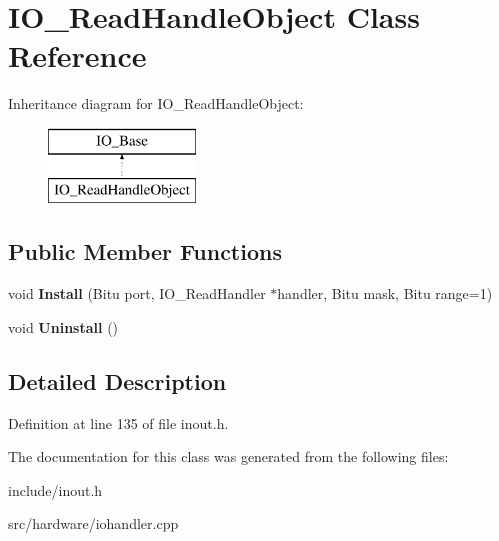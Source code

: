 \hypertarget{classIO__ReadHandleObject}{\section{I\-O\-\_\-\-Read\-Handle\-Object Class Reference}
\label{classIO__ReadHandleObject}
}
Inheritance diagram for I\-O\-\_\-\-Read\-Handle\-Object\-:\begin{figure}[H]
\begin{center}
\leavevmode
\includegraphics[height=2.000000cm]{classIO__ReadHandleObject}
\end{center}
\end{figure}
\subsection*{Public Member Functions}
\begin{DoxyCompactItemize}
\item 
\hypertarget{classIO__ReadHandleObject_ad4e71cb8937ca40c6371653d24333e32}{void {\bfseries Install} (Bitu port, I\-O\-\_\-\-Read\-Handler $\ast$handler, Bitu mask, Bitu range=1)}\label{classIO__ReadHandleObject_ad4e71cb8937ca40c6371653d24333e32}

\item 
\hypertarget{classIO__ReadHandleObject_ad7e8dfdd84ef0e41dcbd1b29d6c02df0}{void {\bfseries Uninstall} ()}\label{classIO__ReadHandleObject_ad7e8dfdd84ef0e41dcbd1b29d6c02df0}

\end{DoxyCompactItemize}


\subsection{Detailed Description}


Definition at line 135 of file inout.\-h.



The documentation for this class was generated from the following files\-:\begin{DoxyCompactItemize}
\item 
include/inout.\-h\item 
src/hardware/iohandler.\-cpp\end{DoxyCompactItemize}
